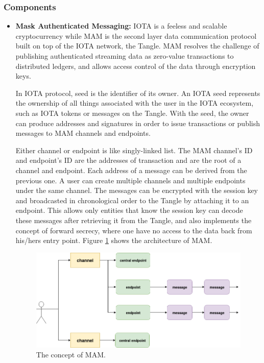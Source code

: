 \documentclass[journal,article,applsci,submit,moreauthors,pdftex]{Definitions/mdpi}
\begin{document}
\subsubsection{Components}
\begin{itemize}[leftmargin=*,labelsep=5.8mm]
\item \textbf{Mask Authenticated Messaging: }
IOTA\cite{IOTAwhitepaper} is a feeless and scalable cryptocurrency while MAM is the second layer data communication protocol built on top of the IOTA network, the Tangle. MAM resolves the challenge of publishing authenticated streaming data as zero-value transactions to distributed ledgers, and allows access control of the data through encryption keys. 

In IOTA protocol, seed is the identifier of its owner. An IOTA seed represents the ownership of all things associated with the user in the IOTA ecosystem, such as IOTA tokens or messages on the Tangle. With the seed, the owner can produce addresses and signatures in order to issue transactions or publish messages to MAM channels and endpoints.

Either channel or endpoint is like singly-linked list. The MAM channel's ID and endpoint's ID are the addresses of transaction and are the root of a channel and endpoint. Each address of a message can be derived from the previous one. A user can create multiple channels and multiple endpoints under the same channel. The messages can be encrypted with the session key and broadcasted in chronological order to the Tangle by attaching it to an endpoint. This allows only entities that know the session key can decode these messages after retrieving it from the Tangle, and also implements the concept of forward secrecy, where one have no access to the data back from his/hers entry point. Figure \ref{fig:mam_struct} shows the architecture of MAM.

\begin{figure}[H]
    \centering
    \includegraphics[width=4.4 in]{mam_struct}
    \caption{The concept of MAM.}
    \label{fig:mam_struct}
\end{figure}


\end{itemize}
\end{document}
